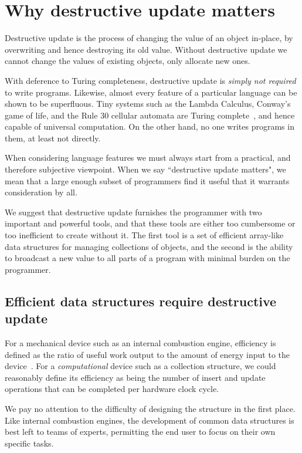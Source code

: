 

\section{Why destructive update matters}
\label{intro:update}

Destructive update is the process of changing the value of an object in-place, by overwriting and hence destroying its old value. Without destructive update we cannot change the values of existing objects, only allocate new ones. 

With deference to Turing completeness, destructive update is \emph{simply not required} to write programs. Likewise, almost every feature of a particular language can be shown to be superfluous. Tiny systems such as the Lambda Calculus, Conway's game of life, and the Rule 30 cellular automata are Turing complete~\cite{rendell:life, cook:universal}, and hence capable of universal computation. On the other hand, no one writes programs in them, at least not directly.

When considering language features we must always start from a practical, and therefore subjective viewpoint. When we say ``destructive update matters", we mean that a large enough subset of programmers find it useful that it warrants consideration by all.

We suggest that destructive update furnishes the programmer with two important and powerful tools, and that these tools are either too cumbersome or too inefficient to create without it. The first tool is a set of efficient array-like data structures for managing collections of objects, and the second is the ability to broadcast a new value to all parts of a program with minimal burden on the programmer.


\subsection{Efficient data structures require destructive update}
For a mechanical device such as an internal combustion engine, efficiency is defined as the ratio of useful work output to the amount of energy input to the device~\cite{giancoli:efficiency}. For a \emph{computational} device such as a collection structure, we could reasonably define its efficiency as being the number of insert and update operations that can be completed per hardware clock cycle. 

We pay no attention to the difficulty of designing the structure in the first place. Like internal combustion engines, the development of common data structures is best left to teams of experts, permitting the end user to focus on their own specific tasks.

